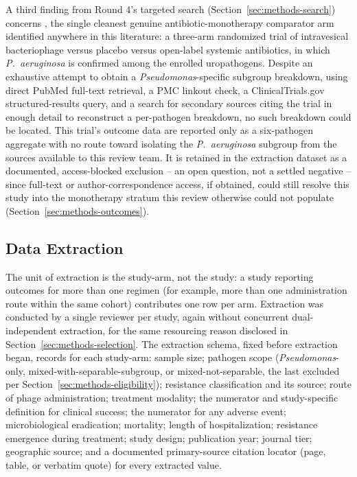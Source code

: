 A third finding from Round 4's targeted search (Section~\ref{sec:methods-search}) concerns \textcite{Leitner2021_lancetid_pyophage}, the single cleanest genuine antibiotic-monotherapy comparator arm identified anywhere in this literature: a three-arm randomized trial of intravesical bacteriophage versus placebo versus open-label systemic antibiotics, in which \textit{P.\ aeruginosa} is confirmed among the enrolled uropathogens. Despite an exhaustive attempt to obtain a \textit{Pseudomonas}-specific subgroup breakdown, using direct PubMed full-text retrieval, a PMC linkout check, a ClinicalTrials.gov structured-results query, and a search for secondary sources citing the trial in enough detail to reconstruct a per-pathogen breakdown, no such breakdown could be located. This trial's outcome data are reported only as a six-pathogen aggregate with no route toward isolating the \textit{P.\ aeruginosa} subgroup from the sources available to this review team. It is retained in the extraction dataset as a documented, access-blocked exclusion -- an open question, not a settled negative -- since full-text or author-correspondence access, if obtained, could still resolve this study into the monotherapy stratum this review otherwise could not populate (Section~\ref{sec:methods-outcomes}).

\subsection{Data Extraction}
\label{sec:methods-extraction}

The unit of extraction is the study-arm, not the study: a study reporting outcomes for more than one regimen (for example, more than one administration route within the same cohort) contributes one row per arm. Extraction was conducted by a single reviewer per study, again without concurrent dual-independent extraction, for the same resourcing reason disclosed in Section~\ref{sec:methods-selection}. The extraction schema, fixed before extraction began, records for each study-arm: sample size; pathogen scope (\textit{Pseudomonas}-only, mixed-with-separable-subgroup, or mixed-not-separable, the last excluded per Section~\ref{sec:methods-eligibility}); resistance classification and its source; route of phage administration; treatment modality; the numerator and study-specific definition for clinical success; the numerator for any adverse event; microbiological eradication; mortality; length of hospitalization; resistance emergence during treatment; study design; publication year; journal tier; geographic source; and a documented primary-source citation locator (page, table, or verbatim quote) for every extracted value.

